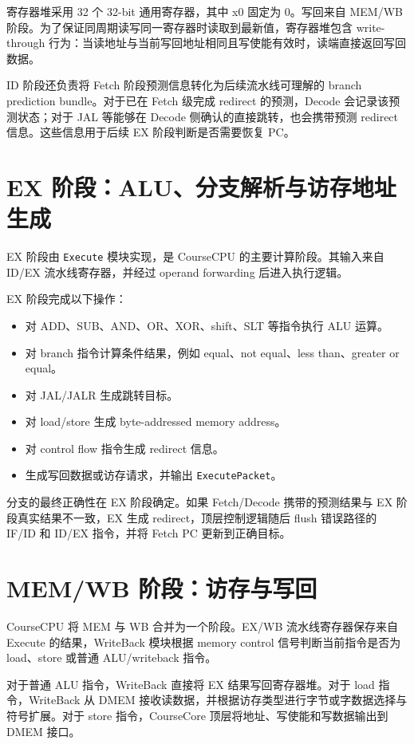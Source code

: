 \documentclass[UTF8,a4paper,12pt]{ctexrep}
\begin{document}
寄存器堆采用 32 个 32-bit 通用寄存器，其中 x0 固定为 0。写回来自 MEM/WB 阶段。为了保证同周期读写同一寄存器时读取到最新值，寄存器堆包含 write-through 行为：当读地址与当前写回地址相同且写使能有效时，读端直接返回写回数据。

ID 阶段还负责将 Fetch 阶段预测信息转化为后续流水线可理解的 branch prediction bundle。对于已在 Fetch 级完成 redirect 的预测，Decode 会记录该预测状态；对于 JAL 等能够在 Decode 侧确认的直接跳转，也会携带预测 redirect 信息。这些信息用于后续 EX 阶段判断是否需要恢复 PC。

\section{EX 阶段：ALU、分支解析与访存地址生成}

EX 阶段由 \texttt{Execute} 模块实现，是 CourseCPU 的主要计算阶段。其输入来自 ID/EX 流水线寄存器，并经过 operand forwarding 后进入执行逻辑。

EX 阶段完成以下操作：

\begin{itemize}
  \item 对 ADD、SUB、AND、OR、XOR、shift、SLT 等指令执行 ALU 运算。
  \item 对 branch 指令计算条件结果，例如 equal、not equal、less than、greater or equal。
  \item 对 JAL/JALR 生成跳转目标。
  \item 对 load/store 生成 byte-addressed memory address。
  \item 对 control flow 指令生成 redirect 信息。
  \item 生成写回数据或访存请求，并输出 \texttt{ExecutePacket}。
\end{itemize}

分支的最终正确性在 EX 阶段确定。如果 Fetch/Decode 携带的预测结果与 EX 阶段真实结果不一致，EX 生成 redirect，顶层控制逻辑随后 flush 错误路径的 IF/ID 和 ID/EX 指令，并将 Fetch PC 更新到正确目标。

\section{MEM/WB 阶段：访存与写回}

CourseCPU 将 MEM 与 WB 合并为一个阶段。EX/WB 流水线寄存器保存来自 Execute 的结果，WriteBack 模块根据 memory control 信号判断当前指令是否为 load、store 或普通 ALU/writeback 指令。

对于普通 ALU 指令，WriteBack 直接将 EX 结果写回寄存器堆。对于 load 指令，WriteBack 从 DMEM 接收读数据，并根据访存类型进行字节或字数据选择与符号扩展。对于 store 指令，CourseCore 顶层将地址、写使能和写数据输出到 DMEM 接口。
\end{document}
